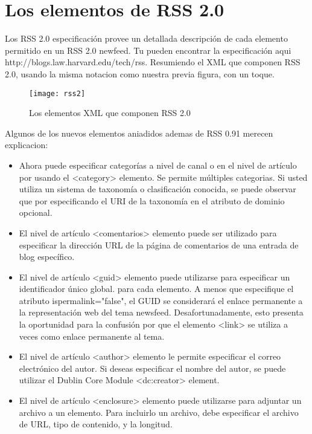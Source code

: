 \section{Los elementos de RSS 2.0}

Los RSS 2.0 especificación provee un detallada descripción de cada elemento permitido en un RSS 2.0
newfeed. Tu pueden encontrar la especificación aqui  http://blogs.law.harvard.edu/tech/rss. Resumiendo
el XML que componen RSS 2.0, usando la misma notacion como nuestra previa figura, con un toque.

\begin{figure}[h]
\centering
\texttt{[image: rss2]}
\caption{Los elementos XML que componen RSS 2.0}
\end{figure}

Algunos de los nuevos elementos aniadidos ademas de RSS 0.91 merecen explicacion:

\begin{itemize}

\item Ahora puede especificar categorías a nivel de canal o en el nivel de artículo por usando el <category>
 elemento. Se permite múltiples categorias. Si usted utiliza un sistema de taxonomía o clasificación 
 conocida, se puede observar que por especificando el URI de la taxonomía en el atributo de dominio opcional.

\item El nivel de artículo <comentarios> elemento puede ser utilizado para especificar la dirección URL de la
página de comentarios de una entrada de blog específico.

\item El nivel de artículo <guid> elemento puede utilizarse para especificar un identificador único global.
para cada elemento. A menos que especifique el atributo ispermalink="false", el GUID se considerará el 
enlace permanente a la representación web del tema newsfeed. Desafortunadamente, esto presenta la oportunidad
para la confusión por que el elemento <link> se utiliza a veces como enlace permanente al tema.

\item El nivel de artículo <author> elemento le permite especificar el correo electrónico del autor. Si deseas
especificar el nombre del autor, se puede utilizar el Dublin Core Module <dc:creator> element.

\item El nivel de artículo <enclosure> elemento puede utilizarse para adjuntar un archivo a un elemento. Para incluirlo
un archivo, debe especificar el archivo de URL, tipo de contenido, y la longitud.

\end{itemize}

